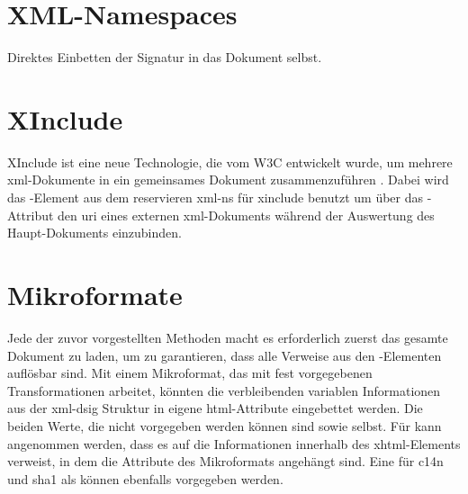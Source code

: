 

\section{XML-Namespaces}
Direktes Einbetten der Signatur in das Dokument selbst.\todo



\section{XInclude}
XInclude ist eine neue Technologie, die vom W3C entwickelt wurde, um mehrere \gls{xml}-Dokumente in ein gemeinsames Dokument zusammenzuführen \cite{xml:oreilly}.
Dabei wird das -Element aus dem reservieren \gls{xml-ns} für \gls{xinclude} benutzt um über das -Attribut den \gls{uri}
eines externen \gls{xml}-Dokuments während der Auswertung des Haupt-Dokuments einzubinden. \todo



\section{Mikroformate}
Jede der zuvor vorgestellten Methoden macht es erforderlich zuerst das gesamte Dokument zu laden, um zu garantieren, dass alle Verweise aus den
-Elementen auflösbar sind. Mit einem Mikroformat, das mit fest vorgegebenen Transformationen arbeitet, könnten die verbleibenden variablen
Informationen aus der \gls{xml-dsig} Struktur in eigene \gls{html}-Attribute eingebettet werden. Die beiden Werte, die nicht vorgegeben werden können sind
 sowie  selbst. 
Für  kann angenommen werden, dass es auf die Informationen innerhalb des \gls{xhtml}-Elements verweist, in dem die Attribute des Mikroformats
angehängt sind. Eine  für \gls{c14n} und \gls{sha1} als  können ebenfalls vorgegeben werden. 


